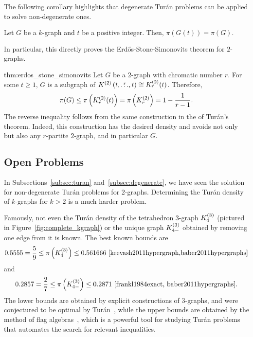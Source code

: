 The following corollary highlights that degenerate Turán problems can be applied to solve non-degenerate ones.
\begin{corollary}
    Let $G$ be a $k$-graph and $t$ be a positive integer.
    Then, $\pi(G(t)) = \pi(G)$.
\end{corollary}

In particular, this directly proves the Erdős-Stone-Simonovits theorem for $2$-graphs.

\begin{delayedproof}{thm:erdos_stone_simonovits}
    Let $G$ be a $2$-graph with chromatic number $r$.
    For some $t \geq 1$, $G$ is a subgraph of
    $K^{(2)}\left(t, \overset{r}{\dots}, t\right) \cong K^{(2)}_{r}(t)$.
    Therefore,
    \[
        \pi(G) \leq \pi\left(K^{(2)}_{r}(t)\right)
        = \pi\left(K^{(2)}_{r}\right) = 1 - \frac{1}{r-1}.
    \]
    The reverse inequality follows from the same construction in the  of Turán's theorem.
    Indeed, this construction has the desired density and avoids not only  but also
    any $r$-partite $2$-graph, and in particular $G$.
\end{delayedproof}

\subsection{Open Problems}\label{subsec:open-problems}

In Subsections~\ref{subsec:turan} and~\ref{subsec:degenerate}, we have
seen the solution for non-degenerate Turán problems for $2$-graphs.
Determining the Turán density of $k$-graphs for $k > 2$ is a much harder problem.

Famously, not even the Turán density of the tetrahedron $3$-graph $K^{(3)}_{4}$
(pictured in Figure~\ref{fig:complete_kgraph}) or the unique graph $K^{(3)}_{4-}$
obtained by removing one edge from it is known.
The best known bounds are
\[
    0.5555 = \frac{5}{9}
    \leq \pi\left(\completesuperindex{3}{4}\right)
    \leq 0.561666~\cite{keevash2011hypergraph,baber2011hypergraphs} %
\]
and
\[
     0.2857 = \frac{2}{7}
     \leq \pi\left(K^{(3)}_{4-}\right)
     \leq 0.2871~\cite{frankl1984exact, baber2011hypergraphs}.
\]
The lower bounds are obtained by explicit constructions of $3$-graphs,
and were conjectured to be optimal by Turán~\cite{keevash2011hypergraph},
while the upper bounds are obtained by the method of flag algebras~\cite{razborov2007flag},
which is a powerful tool for studying Turán problems that automates the search for relevant inequalities.

